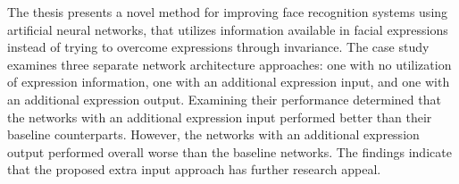 \noindent The thesis presents a novel method for improving face recognition systems using artificial neural networks, that utilizes information available in facial expressions instead of trying to overcome expressions through invariance. The case study examines three separate network architecture approaches: one with no utilization of expression information, one with an additional expression input, and one with an additional expression output. Examining their performance determined that the networks with an additional expression input performed better than their baseline counterparts. However, the networks with an additional expression output performed overall worse than the baseline networks. The findings indicate that the proposed extra input approach has further research appeal.

\clearpage